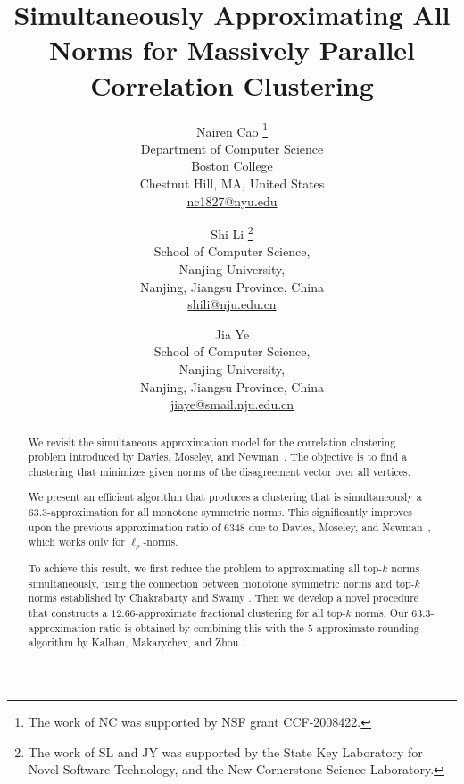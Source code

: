 \documentclass[11pt]{article}
\begin{document}
\begin{CJK*}{UTF8}{gbsn} 


\title{Simultaneously Approximating All Norms for Massively Parallel Correlation Clustering}

\author{ 
{Nairen Cao \footnote{The work of NC was supported by NSF grant CCF-2008422.}} \\ Department of Computer Science \\ Boston College \\ Chestnut Hill, MA, United States \\ 
\href{mailto:nc1827@nyu.edu}{nc1827@nyu.edu} 
\and Shi Li \footnote{The work of SL and JY was supported by the State Key Laboratory for Novel Software Technology, and the New Cornerstone Science Laboratory.} \\ School of Computer Science, \\ Nanjing University, \\ Nanjing, Jiangsu Province, China \\ \href{mailto:shili@nju.edu.cn}{shili@nju.edu.cn} \and Jia Ye \footnotemark[\value{footnote}] \\ School of Computer Science, \\ Nanjing University, \\ Nanjing, Jiangsu Province, China \\\href{mailto:jiaye@smail.nju.edu.cn}{jiaye@smail.nju.edu.cn}}
\date{}


\maketitle

\begin{abstract}
We revisit the simultaneous approximation model for the correlation clustering problem introduced by Davies, Moseley, and Newman~\cite{davies2023one}. The objective is to find a clustering that minimizes given norms of the disagreement vector over all vertices. 

We present an efficient algorithm that produces a clustering that is simultaneously a $63.3$-approximation for all monotone symmetric norms. This significantly improves upon the previous approximation ratio of $6348$ due to Davies, Moseley, and Newman~\cite{davies2023one}, which works only for $\ell_p$-norms. 

To achieve this result, we first reduce the problem to approximating all top-$k$ norms simultaneously, using the connection between monotone symmetric norms and top-$k$ norms established by Chakrabarty and Swamy \cite{chakrabarty2019approximation}. Then we develop a novel procedure that constructs a $12.66$-approximate fractional clustering for all top-$k$ norms. Our $63.3$-approximation ratio is obtained by combining this with the $5$-approximate rounding algorithm by Kalhan, Makarychev, and Zhou~\cite{kalhan2019correlation}.


\end{abstract}
\end{CJK*}
\end{document}
